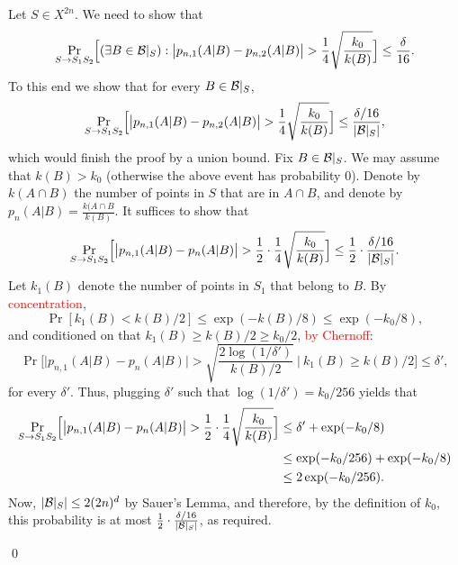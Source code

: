\documentclass{article}
\newcommand{\B}{{\cal B}}
\newcommand{\new}[1]{\textcolor{red}{#1}}
\newcommand{\comment}[3]{\marginpar{\textcolor{#2}{#1: #3}}}
\newcommand{\shay}[1]{\comment{Shay}{red}{#1}}
\begin{document}
Let $S\in X^{2n}$. 
We need to show that
\[\Pr_{S\to S_1S_2}\Bigl[(\exists B\in \B|_S) : \bigl\lvert p_{n,1}(A \vert B) - p_{n,2}(A \vert B)  \bigr\rvert > \frac{1}{4}\sqrt{\frac{k_0}{k(B)}} \Bigr] \leq \frac{\delta}{16}.\]
To this end we show that
for every $B\in \B|_S$, 
\[\Pr_{S\to S_1S_2}\Bigl[\bigl\lvert p_{n,1}(A \vert B) - p_{n,2}(A \vert B)  \bigr\rvert > \frac{1}{4}\sqrt{\frac{k_0}{k(B)}} \Bigr] \leq \frac{\delta/16}{\lvert \B|_S\rvert},\]
which would finish the proof by a union bound.
Fix $B\in \B|_S$. 
We may assume that $k(B)> k_0$ (otherwise the above event has probability $0$). 
Denote by $k(A\cap B)$ the number of points in $S$
that are in $A\cap B$, and denote by $p_n(A\vert B) = \frac{k(A\cap B}{k(B)}$.
It suffices to show that
\[\Pr_{S\to S_1S_2}\Bigl[\bigl\lvert p_{n,1}(A \vert B) - p_{n}(A \vert B)  \bigr\rvert > \frac{1}{2}\cdot\frac{1}{4}\sqrt{\frac{k_0}{k(B)}} \Bigr] \leq \frac{1}{2}\cdot\frac{\delta/16}{\lvert \B|_S\rvert}.\]
Let $k_1(B)$ denote the number of points in $S_1$ that belong to $B$.
By \new{concentration},
\shay{Here we should refer to the statement that sampling without repetitions is more concentrated.}
\[ \Pr[k_1(B) < k(B)/2] \leq \exp(-k(B)/8) \leq \exp(-k_0/8),\]
and conditioned on that $k_1(B) \geq k(B)/2\geq k_0/2$, \new{by Chernoff}:
\[\Pr\Biggl[ \lvert p_{n,1}(A \vert B) - p_n(A \vert B) \rvert >\sqrt{\frac{2\log(1/\delta')}{k(B)/2}}~ \Biggr\vert~ k_1(B) \geq k(B)/2\Biggr] \leq \delta',
\]
for every $\delta'$. 
Thus, plugging $\delta'$ such that $\log(1/\delta') = k_0/256$ yields that
\begin{align*}
\Pr_{S\to S_1S_2}\Bigl[\bigl\lvert p_{n,1}(A \vert B) - p_{n}(A \vert B)  \bigr\rvert > \frac{1}{2}\cdot\frac{1}{4}\sqrt{\frac{k_0}{k(B)}} \Bigr] 
&\leq  \delta' + \exp(-k_0/8)\\
&\leq  \exp(-k_0/256) + \exp(-k_0/8)\\
&\leq 2\exp(-k_0/256).
\end{align*}
Now, $\lvert \B|_S\rvert \leq 2(2n)^d$ by Sauer's Lemma,  and therefore, by the definition of $k_0$,
this probability is at most $\frac{1}{2}\cdot\frac{\delta/16}{\lvert \B|_S\rvert}$, as required.

\qed
\end{document}
